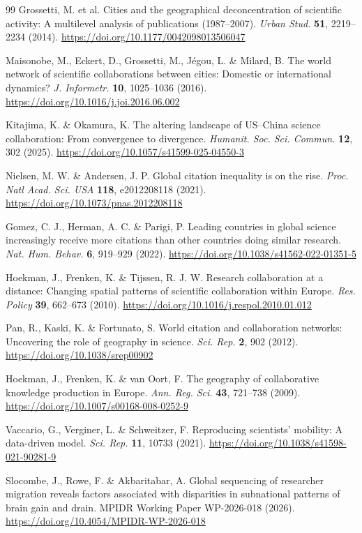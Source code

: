 \begin{thebibliography}{99}
Grossetti, M. et al. Cities and the geographical deconcentration of scientific activity: A multilevel analysis of publications (1987--2007). \textit{Urban Stud.} \textbf{51}, 2219--2234 (2014). \url{https://doi.org/10.1177/0042098013506047}

Maisonobe, M., Eckert, D., Grossetti, M., Jégou, L. \& Milard, B. The world network of scientific collaborations between cities: Domestic or international dynamics? \textit{J. Informetr.} \textbf{10}, 1025--1036 (2016). \url{https://doi.org/10.1016/j.joi.2016.06.002}

Kitajima, K. \& Okamura, K. The altering landscape of US--China science collaboration: From convergence to divergence. \textit{Humanit. Soc. Sci. Commun.} \textbf{12}, 302 (2025). \url{https://doi.org/10.1057/s41599-025-04550-3}

Nielsen, M. W. \& Andersen, J. P. Global citation inequality is on the rise. \textit{Proc. Natl Acad. Sci. USA} \textbf{118}, e2012208118 (2021). \url{https://doi.org/10.1073/pnas.2012208118}

Gomez, C. J., Herman, A. C. \& Parigi, P. Leading countries in global science increasingly receive more citations than other countries doing similar research. \textit{Nat. Hum. Behav.} \textbf{6}, 919--929 (2022). \url{https://doi.org/10.1038/s41562-022-01351-5}

Hoekman, J., Frenken, K. \& Tijssen, R. J. W. Research collaboration at a distance: Changing spatial patterns of scientific collaboration within Europe. \textit{Res. Policy} \textbf{39}, 662--673 (2010). \url{https://doi.org/10.1016/j.respol.2010.01.012}

Pan, R., Kaski, K. \& Fortunato, S. World citation and collaboration networks: Uncovering the role of geography in science. \textit{Sci. Rep.} \textbf{2}, 902 (2012). \url{https://doi.org/10.1038/srep00902}

Hoekman, J., Frenken, K. \& van Oort, F. The geography of collaborative knowledge production in Europe. \textit{Ann. Reg. Sci.} \textbf{43}, 721--738 (2009). \url{https://doi.org/10.1007/s00168-008-0252-9}

Vaccario, G., Verginer, L. \& Schweitzer, F. Reproducing scientists’ mobility: A data-driven model. \textit{Sci. Rep.} \textbf{11}, 10733 (2021). \url{https://doi.org/10.1038/s41598-021-90281-9}

Slocombe, J., Rowe, F. \& Akbaritabar, A. Global sequencing of researcher migration reveals factors associated with disparities in subnational patterns of brain gain and drain. MPIDR Working Paper WP-2026-018 (2026). \url{https://doi.org/10.4054/MPIDR-WP-2026-018}


\end{thebibliography}

